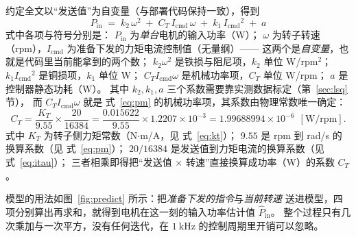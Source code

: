 \documentclass[cn,blue,11pt,device=normal]{elegantnote}
\newcommand{\Pin}{P_{\mathrm{in}}{}}
\newcommand{\Icmd}{I_{\mathrm{cmd}}{}}
\newcommand{\KT}{K_{T}{}}
\newcommand{\CT}{C_{T}{}}
\newcommand{\fref}[1]{式~\eqref{#1}}
\begin{document}
约定全文以“发送值”为自变量（与部署代码保持一致），得到
\begin{equation}\label{eq:model}
  \boxed{\;\Pin \;=\; k_2\,\omega^2 \;+\; \CT\,\Icmd\,\omega \;+\; k_1\,\Icmd^2 \;+\; a\;}
\end{equation}
式中各项与符号分别是：
$\Pin$ 为\emph{单台}电机的输入功率（W）；
$\omega$ 为转子转速（rpm），$\Icmd$ 为准备下发的力矩电流控制值（无量纲）——
这两个是\emph{自变量}，也就是代码里当前能拿到的两个数；
$k_2\omega^2$ 是铁损与阻尼项，$k_2$ 单位 W/rpm$^2$；
$k_1\Icmd^2$ 是铜损项，$k_1$ 单位 W；
$\CT\Icmd\omega$ 是机械功率项，$\CT$ 单位 W/rpm；
$a$ 是控制器静态功耗（W）。
其中 $k_2,k_1,a$ 三个系数需要靠实测数据标定（第~\ref{sec:lsq} 节），
而 $\CT\Icmd\omega$ 就是 \fref{eq:pm} 的机械功率项，其系数由物理常数唯一确定：
\begin{equation}\label{eq:ct}
  \CT = \frac{\KT}{9.55}\times\frac{20}{16384}
      = \frac{0.015622}{9.55}\times1.2207\times10^{-3}
      = 1.99688994\times10^{-6}\ \ [\mathrm{W/rpm}].
\end{equation}
式中 $\KT$ 为转子侧力矩常数（N$\cdot$m/A，见 \fref{eq:kt}）；
$9.55$ 是 rpm 到 rad/s 的换算系数（见 \fref{eq:pm}）；
$20/16384$ 是发送值到力矩电流的换算系数（见 \fref{eq:itau}）；
三者相乘即得把“发送值 $\times$ 转速”直接换算成功率（W）的系数 $\CT$。

模型的用法如图~\ref{fig:predict} 所示：把\emph{准备下发的指令}与\emph{当前转速}
送进模型，四项分别算出再求和，就得到电机在这一刻的输入功率估计值 $\hat\Pin$。
整个过程只有几次乘加与一次平方，没有任何迭代，在 $1\ \mathrm{kHz}$ 的控制周期里开销可以忽略。
\end{document}
